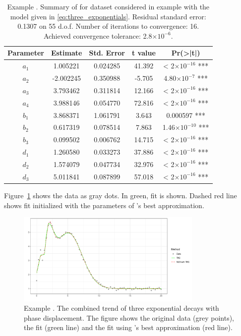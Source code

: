 \begin{table}[htb]
\centering
\begin{tabular}{ccccc}
\toprule
Parameter &  Estimate & Std. Error & t value & Pr(>|t|)\\   \midrule    
$a_1$ & 1.005221 &  0.024285 & 41.392 & < 2$\times 10^{-16}$ ***\\
$a_2$ &-2.002245 &  0.350988 & -5.705 &4.80$\times 10^{-7}$ ***\\
$a_3$ & 3.793462 &  0.311814 & 12.166 & < 2$\times 10^{-16}$ ***\\
$a_4$ & 3.988146 &  0.054770 & 72.816 & < 2$\times 10^{-16}$ ***\\
$b_1$ & 3.868371 &  1.061791 &  3.643 &0.000597 ***\\
$b_2$ & 0.617319 &  0.078514 &  7.863 &1.46$\times 10^{-10}$ ***\\
$b_3$ & 0.099502 &  0.006762 & 14.715 & < 2$\times 10^{-16}$ ***\\
$d_1$ & 1.260580 &  0.033273 & 37.886 & < 2$\times 10^{-16}$ ***\\
$d_2$ & 1.574079 &  0.047734 & 32.976 & < 2$\times 10^{-16}$ ***\\
$d_3$ & 5.011841 &  0.087899 & 57.018 & < 2$\times 10^{-16}$ ***\\
\bottomrule
\end{tabular} 
\caption{Example . Summary of  for dataset considered in example  with the model given in \eqref{eq:three_exponentials}. Residual standard error: 0.1307 on 55 d.o.f. Number of iterations to convergence: 16. Achieved convergence tolerance:  2.8$\times 10^{-6}$.}
\label{t:three_exponentials_summary_NLS_best_approximation}
\end{table}



Figure~\ref{fig:three_exponentials} shows the data as gray dots. In green,  fit is shown. Dashed red line shows  fit initialized with the parameters of 's best approximation.

\begin{figure}[htb]
\centering
\includegraphics[width=0.8\textwidth]{example3.pdf}
\caption{Example . The combined trend of three exponential decays with phase displacement. The figure shows the original data (grey points), the  fit (green line) and the  fit using 's best approximation (red line).}
\label{fig:three_exponentials}
\end{figure}

